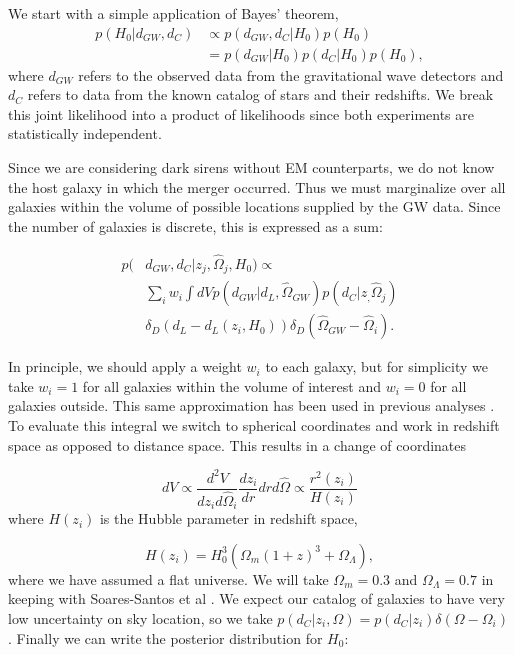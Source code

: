 
We start with a simple application of Bayes' theorem,
\begin{align}
    p(H_0|d_{GW}, d_C)&\propto p(d_{GW}, d_C|H_0)p(H_0)\nonumber\\
    &= p(d_{GW}|H_0)p(d_C|H_0)p(H_0),
\label{eq:bayes}
\end{align}
where $d_{GW}$ refers to the observed data from the gravitational wave detectors and $d_C$ refers to data from the known catalog of stars and their redshifts. We break this joint likelihood into a product of likelihoods since both experiments are statistically independent.

Since we are considering dark sirens without EM counterparts, we do not know the host galaxy in which the merger occurred. Thus we must marginalize over all galaxies within the volume of possible locations supplied by the GW data. Since the number of galaxies is discrete, this is expressed as a sum:

\begin{align}
    p(&d_{GW}, d_C|{z_j, \hat{\Omega}_j},H_0)  \propto  \nonumber\\
    &\sum_{i} w_i \int dV p(d_{GW}|d_L, \hat{\Omega}_{GW}) 
    p(d_C|{z_, \hat{\Omega}_j}) \nonumber\\
    & \delta_D (d_L - d_L(z_i, H_0)) \delta_D (\hat{\Omega}_{GW} - \hat{\Omega}_i).
    \label{eq:marginal_like}
\end{align}

In principle, we should apply a weight $w_i$ to each galaxy, but for simplicity we take $w_i=1$ for all galaxies within the volume of interest and $w_i=0$ for all galaxies outside. This same approximation has been used in previous analyses \cite{Chen_2018,GW170814_DES,Nair_2018}. To evaluate this integral we switch to spherical coordinates and work in redshift space as opposed to distance space. This results in a change of coordinates

\begin{equation}
dV \propto \frac{d^2 V}{d z_i d\hat{\Omega}_i} \frac{d z_i}{d r} d r d\hat{\Omega} \propto \frac{r^2(z_i)}{H(z_i)}
\end{equation}
where $H(z_i)$ is the Hubble parameter in redshift space,

\begin{equation}
H(z_i) = H_0^3 \left(\Omega_m (1+z)^3 + \Omega_\Lambda\right),
\end{equation}
where we have assumed a flat universe. We will take $\Omega_m = 0.3$ and $\Omega_\Lambda = 0.7$ in keeping with Soares-Santos et al \cite{GW170814_DES}. We expect our catalog of galaxies to have very low uncertainty on sky location, so we take $p(d_C|z_i,\Omega)=p(d_C|z_i)\delta(\Omega - \Omega_i)$. Finally we can write the posterior distribution for $H_0$:

